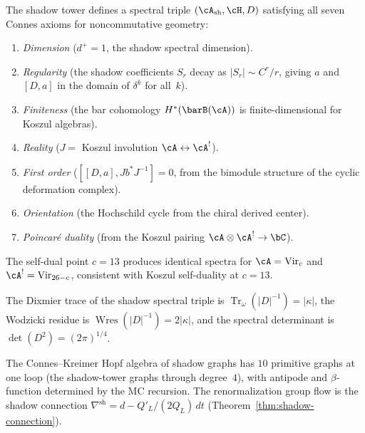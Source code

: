 \begin{remark}
\label{rem:connes-spectral-triple}
The shadow tower defines a spectral triple
$(\cA_{\mathrm{sh}}, \cH, D)$ satisfying all seven Connes
axioms for noncommutative geometry:
\begin{enumerate}[label=\textup{(\arabic*)}]
\item \emph{Dimension} ($d^+ = 1$, the shadow spectral
 dimension).
\item \emph{Regularity} (the shadow coefficients $S_r$
 decay as $|S_r| \sim C^r/r$, giving $a$ and $[D, a]$
 in the domain of $\delta^k$ for all~$k$).
\item \emph{Finiteness} (the bar cohomology
 $H^*(\barB(\cA))$ is finite-dimensional for Koszul
 algebras).
\item \emph{Reality} ($J = $ Koszul involution
 $\cA \leftrightarrow \cA^!$).
\item \emph{First order} ($[[D, a], Jb^*J^{-1}] = 0$,
 from the bimodule structure of the cyclic deformation
 complex).
\item \emph{Orientation} (the Hochschild cycle from the
 chiral derived center).
\item \emph{Poincar\'e duality} (from the Koszul pairing
 $\cA \otimes \cA^! \to \bC$).
\end{enumerate}
The self-dual point $c = 13$ produces identical spectra
for $\cA = \mathrm{Vir}_c$ and $\cA^! = \mathrm{Vir}_{26-c}$,
consistent with Koszul self-duality at $c = 13$.

The Dixmier trace of the shadow spectral triple is
$\operatorname{Tr}_\omega(|D|^{-1}) = |\kappa|$,
the Wodzicki residue is
$\operatorname{Wres}(|D|^{-1}) = 2|\kappa|$,
and the spectral determinant is
$\det(D^2) = (2\pi)^{1/4}$.

The Connes--Kreimer Hopf algebra of shadow graphs has
$10$ primitive graphs at one loop (the shadow-tower
graphs through degree~$4$), with antipode and
$\beta$-function determined by the MC recursion.
The renormalization group flow is the shadow connection
$\nabla^{\mathrm{sh}} = d - Q'_L/(2Q_L)\,dt$
(Theorem~\ref{thm:shadow-connection}).
\end{remark}


